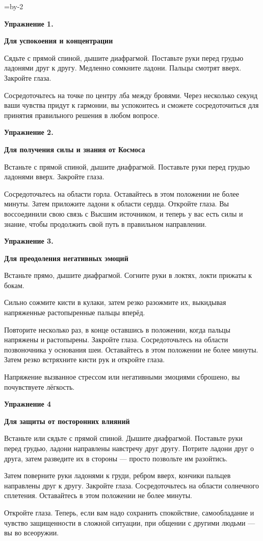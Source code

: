 \pdfhorigin=24mm \hsize=\pdfpagewidth \advance\hsize by-2\pdfhorigin
\pdfvorigin=20mm
\vsize=257mm
\nopagenumbers
\centerline{\bf Упражнение 1.}
\centerline{\bf Для успокоения и концентрации}
\medskip
Сядьте с прямой спиной, дышите диафрагмой. Поставьте руки перед грудью ладонями друг к другу.
Медленно сомкните ладони. Пальцы смотрят вверх. Закройте глаза.

Сосредоточьтесь на точке по центру лба между бровями. Через несколько секунд ваши чувства придут
к гармонии, вы успокоитесь и сможете сосредоточиться для принятия правильного решения в любом
вопросе.
\bigskip
\centerline{\bf Упражнение 2.}
\centerline{\bf Для получения силы и знания от Космоса}
\medskip
Встаньте с прямой спиной, дышите диафрагмой. Поставьте руки перед грудью ладонями вверх. Закройте
глаза.

Сосредоточьтесь на области горла. Оставайтесь в этом положении не более минуты. Затем приложите
ладони к области сердца. Откройте глаза. Вы воссоединили свою связь с Высшим источником, и теперь у вас есть силы и знание, чтобы продолжить свой путь в правильном направлении.

\bigskip
\centerline{\bf Упражнение 3.}
\centerline{\bf Для преодоления негативных эмоций}
\medskip
Встаньте прямо, дышите диафрагмой. Согните руки в локтях, локти прижаты к бокам.

Сильно сожмите кисти в кулаки, затем резко разожмите их, выкидывая напряженные растопыренные
пальцы вперёд.

Повторите несколько раз, в конце оставшись в положении, когда пальцы напряжены и растопырены. Закройте глаза. Сосредоточьтесь на области позвоночника у основания шеи. Оставайтесь в этом положении не более минуты. Затем резко встряхните кисти рук и откройте глаза.

Напряжение вызванное стрессом или негативными эмоциями сброшено, вы почувствуете лёгкость.

\bigskip
\centerline{\bf Упражнение 4}
\centerline{\bf Для защиты от посторонних влияний}
\medskip
Встаньте или сядьте с прямой спиной. Дышите диафрагмой. Поставьте руки перед грудью, ладони
направлены навстречу друг другу. Потрите ладони
друг о друга, затем разведите их в стороны --- просто позвольте им разойтись.

Затем поверните руки ладонями к груди, ребром вверх, кончики пальцев направлены друг к другу.
Закройте глаза. Сосредоточьтесь на области солнечного сплетения. Оставайтесь в этом положении не
более минуты.

Откройте глаза. Теперь, если вам надо сохранить спокойствие, самообладание и чувство защищенности
в сложной ситуации, при общении с другими людьми --- вы во всеоружии.


